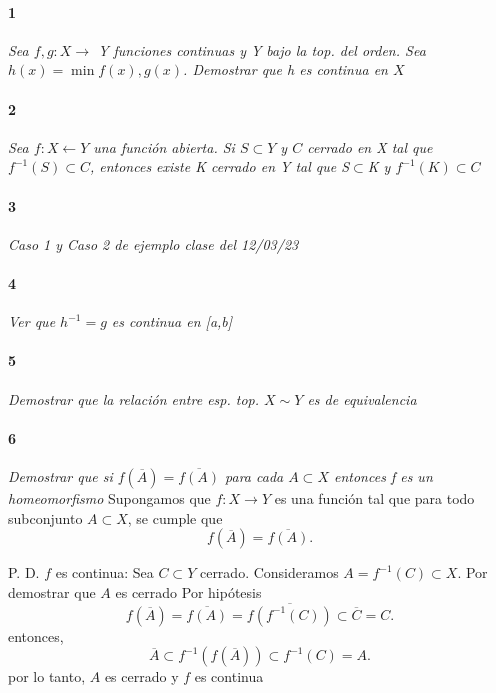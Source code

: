 \documentclass[12pt]{article}
\author{Alumnos: \\Arturo Rodriguez Contreras - 2132880 \\
Jonathan Raymundo Torres Cardenas - 1949731\\
Praxedis Jimenes Ruvalcaba \\
Erick Román Montemayor Treviño - 1957959 \\
Alexis Noe Mora Leyva \\
Everardo Flores Rivera - 2127301}
\begin{document}
\maketitle

\paragraph{1}
\textit{Sea $f,g:X\rightarrow$ Y funciones continuas y Y bajo la top. del orden. Sea $h(x)=\min{f(x),g(x)}$. Demostrar que h es continua en $X$}

\paragraph{2}
\textit{Sea $f:X\leftarrow Y$ una función abierta. Si $S \subset Y$ y $C$ cerrado en X tal que $f^{-1}(S)\subset C$, entonces existe K cerrado en Y tal que S$\subset$K y $f^{-1}(K)\subset C$}

\paragraph{3}
\textit{Caso 1 y Caso 2 de ejemplo clase del 12/03/23} 


\paragraph{4}
\textit{Ver que $h^{-1}=g$ es continua en [a,b]}

\paragraph{5}
\textit{Demostrar que la relación entre esp. top. $X\sim Y$ es de equivalencia}

\paragraph{6}
\textit{Demostrar que si $f(\overline{A})=\overline{f(A)}$ para cada $A\subset X$ entonces f es un homeomorfismo}
Supongamos que \( f : X \to Y \) es una función tal que para todo subconjunto \( A \subset X \), se cumple que
\[
f(\overline{A}) = \overline{f(A)}.
\]

P. D. \( f \) es continua: Sea \( C \subset Y \) cerrado. Consideramos \( A = f^{-1}(C) \subset X \). Por demostrar que \( A \) es cerrado
Por hipótesis
\[
f(\overline{A}) = \overline{f(A)} = \overline{f(f^{-1}(C))} \subset \overline{C} = C.
\]
entonces,
\[
\overline{A} \subset f^{-1}(f(\overline{A})) \subset f^{-1}(C) = A.
\]
por lo tanto, \( A \) es cerrado y \( f \) es continua
\end{document}
